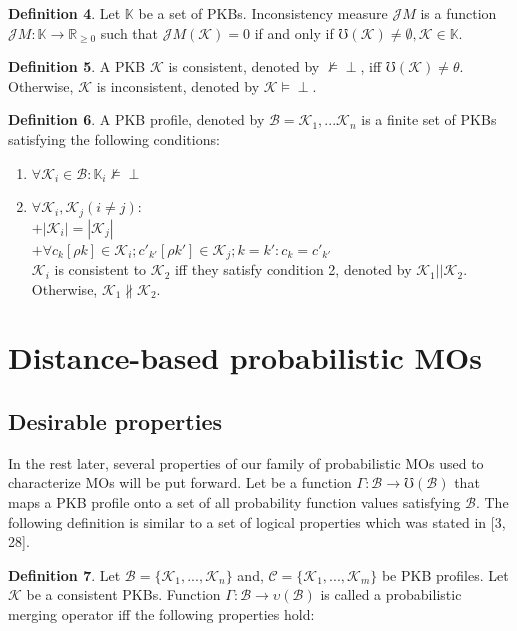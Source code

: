 \documentclass[]{iosart2c}
\begin{document}
  \textbf{Definition 4}. Let $\mathbb{K}$ be a set of PKBs. Inconsistency measure $\mathcal{J}M$ is a function $\mathcal{J}M: \mathbb{K} \to \mathbb {R}_{\geq 0}$ such that $\mathcal{J}M(\mathcal{K}) = 0$ if and only if $\mho (\mathcal{K}) \neq \emptyset, \mathcal{K} \in \mathbb{K}$.

  \textbf{Definition 5}. A PKB $\mathcal{K}$ is consistent, denoted by $\nvDash \perp$, iff $\mho (\mathcal{K}) \neq \theta$. Otherwise, $\mathcal{K}$ is inconsistent, denoted by $\mathcal{K} \models \perp$.

  \textbf{Definition 6}. A PKB profile, denoted by $\mathcal{B} = {\mathcal{K}_1, ...\mathcal{K}_n}$ is a finite set of PKBs satisfying the following conditions:

  \begin{enumerate}

    \item $\forall \mathcal{K}_i \in \mathcal{B} : \mathbb{K}_i \nvDash \perp$
    \item $\forall \mathcal{K}_i,\mathcal{K}_j (i \neq j) :$\\
    $+|\mathcal{K}_i| = |\mathcal{K}_j|$ \\
    $+\forall c_k[\rho k] \in \mathcal{K}_i; c'_{k'} [\rho k'] \in \mathcal{K}_j; k = k' : c_k = c'_{k'}$\\
    $\mathcal{K}_i$ is consistent to $\mathcal{K}_2$ iff they satisfy condition 2, denoted by $\mathcal{K}_1||\mathcal{K}_2$. Otherwise, $\mathcal{K}_1 \nparallel \mathcal{K}_2$.

  \end{enumerate}


  \section{Distance-based probabilistic MOs}

  \subsection{Desirable properties}

  In the rest later, several properties of our family of probabilistic MOs used to characterize MOs will be put forward. Let be a function $\Gamma: \mathcal{B} \to \mho(\mathcal{B})$ that maps a PKB profile onto a set of all probability function values satisfying $\mathcal{B}$. The following definition is similar to a set of logical properties which was stated in [3, 28].

  \textbf{Definition 7}. Let $\mathcal{B} = \{\mathcal{K}_1 , ... ,\mathcal{K}_n\}$ and, $\mathcal{C} = \{\mathcal{K}_1, ... ,\mathcal{K}_m\}$ be PKB profiles. Let $\mathcal{K}$ be a consistent PKBs. Function $\Gamma: \mathcal{B} \to \upsilon(\mathcal{B})$ is called a probabilistic merging operator iff the following properties hold:
\end{document}
